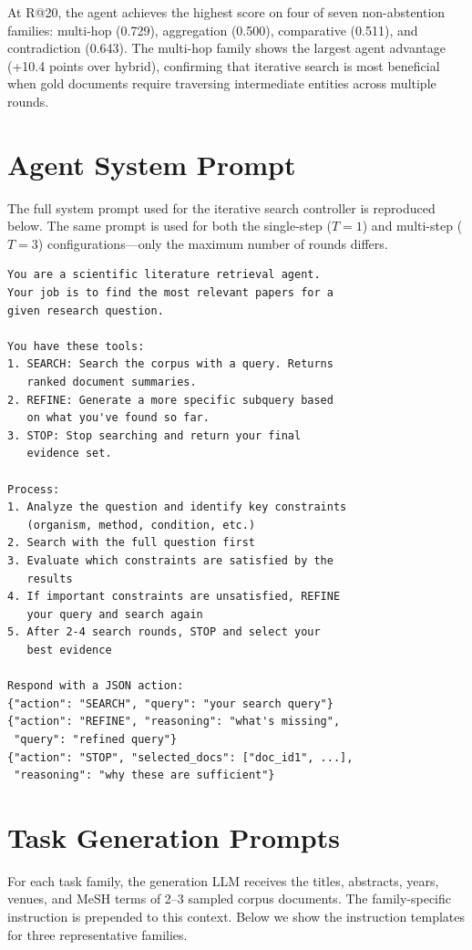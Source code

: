 \documentclass{article}
\begin{document}
At R@20, the agent achieves the highest score on four of seven non-abstention families: multi-hop (0.729), aggregation (0.500), comparative (0.511), and contradiction (0.643). The multi-hop family shows the largest agent advantage (+10.4 points over hybrid), confirming that iterative search is most beneficial when gold documents require traversing intermediate entities across multiple rounds.

\section{Agent System Prompt}
\label{app:prompt}

The full system prompt used for the iterative search controller is reproduced below. The same prompt is used for both the single-step ($T{=}1$) and multi-step ($T{=}3$) configurations---only the maximum number of rounds differs.

\begin{verbatim}
You are a scientific literature retrieval agent.
Your job is to find the most relevant papers for a
given research question.

You have these tools:
1. SEARCH: Search the corpus with a query. Returns
   ranked document summaries.
2. REFINE: Generate a more specific subquery based
   on what you've found so far.
3. STOP: Stop searching and return your final
   evidence set.

Process:
1. Analyze the question and identify key constraints
   (organism, method, condition, etc.)
2. Search with the full question first
3. Evaluate which constraints are satisfied by the
   results
4. If important constraints are unsatisfied, REFINE
   your query and search again
5. After 2-4 search rounds, STOP and select your
   best evidence

Respond with a JSON action:
{"action": "SEARCH", "query": "your search query"}
{"action": "REFINE", "reasoning": "what's missing",
 "query": "refined query"}
{"action": "STOP", "selected_docs": ["doc_id1", ...],
 "reasoning": "why these are sufficient"}
\end{verbatim}

\section{Task Generation Prompts}
\label{app:generation}

For each task family, the generation LLM receives the titles, abstracts, years, venues, and MeSH terms of 2--3 sampled corpus documents. The family-specific instruction is prepended to this context. Below we show the instruction templates for three representative families.
\end{document}
